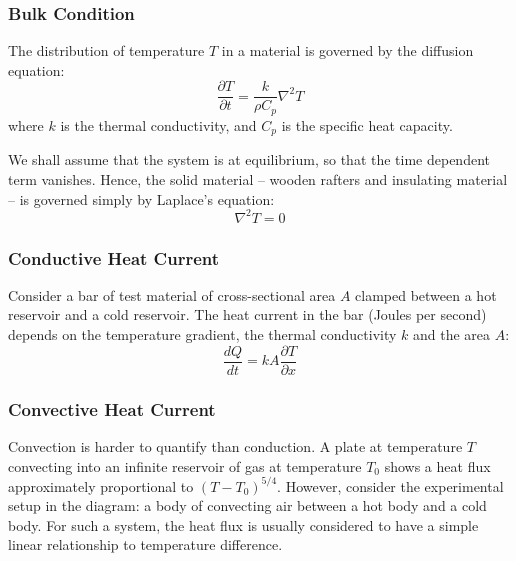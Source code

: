 \documentclass[a4paper]{report}
\begin{document}
\subsubsection*{Bulk Condition}

The distribution of temperature $T$ in a material is governed by the diffusion equation:
\begin{equation}
\frac{\partial T}{\partial t} = \frac{k}{\rho C_p} \nabla^2 T
\end{equation}
where $k$ is the thermal conductivity, and $C_p$ is the specific heat capacity.

We shall assume that the system is at equilibrium, so that the time dependent term vanishes.  Hence, the solid material -- wooden rafters and insulating material -- is governed simply by Laplace's equation:
\begin{equation}
\nabla^2 T = 0
\end{equation}

\subsubsection*{Conductive Heat Current}
Consider a bar of test material of cross-sectional area $A$ clamped between a hot reservoir and a cold reservoir.
The heat current in the bar (Joules per second) depends on the temperature gradient, the thermal conductivity $k$ and the area $A$:
\begin{equation}
\frac{dQ}{dt} = k A \frac{\partial T}{\partial x}
\end{equation}

\begin{center}
\end{center}

\subsubsection*{Convective Heat Current}
Convection is harder to quantify than conduction.   
A plate at temperature $T$ convecting into an infinite reservoir of gas at temperature $T_0$ shows a heat flux approximately proportional to $(T - T_0)^{5/4}$.
However, consider the experimental setup in the diagram: a body of convecting air between a hot body and a cold body.  For such a system, the heat flux is usually considered to have a simple linear relationship to temperature difference. 
\end{document}
